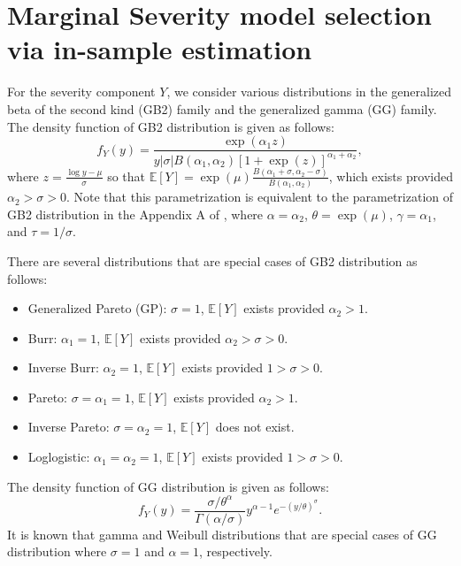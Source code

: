\documentclass[11pt]{article}
\begin{document}
{\pagebreak
\appendix

\section{Marginal Severity model selection via in-sample estimation}
\label{app:A}

For the severity component $Y$, we consider various distributions in the generalized beta of the second kind (GB2) family and the generalized gamma (GG) family. The density function of GB2 distribution is given as follows:
$$
f_{Y}(y)={\frac {\exp(\alpha_1 z)}{y |\sigma| B(\alpha_1,\alpha_2)[1+\exp(z)]^{\alpha_1+\alpha_2}}},
$$
where  $z=\frac{\log y - \mu}{\sigma}$ so that $\mathbb{E}[Y]=\exp(\mu) \frac{B(\alpha_1+\sigma, \alpha_2-\sigma)}{B(\alpha_1, \alpha_2)}$, which exists provided $\alpha_2>\sigma>0$. Note that this parametrization is equivalent to the parametrization of GB2 distribution in the Appendix A of \citet{Klugman2012}, where $\alpha=\alpha_2$, $\theta= \exp(\mu)$, $\gamma=\alpha_1$, and $\tau=1/\sigma$. 

There are several distributions that are special cases of GB2 distribution as follows:
\begin{itemize}
	\item Generalized Pareto (GP): $\sigma=1$, $\mathbb{E}[Y]$ exists provided $\alpha_2>1$.
	\item Burr: $\alpha_1=1$, $\mathbb{E}[Y]$ exists provided $\alpha_2>\sigma >0$.
	\item Inverse Burr: $\alpha_2=1$, $\mathbb{E}[Y]$ exists provided $1>\sigma >0$.
	\item Pareto: $\sigma=\alpha_1=1$, $\mathbb{E}[Y]$ exists provided $\alpha_2>1$.
	\item Inverse Pareto: $\sigma=\alpha_2=1$, $\mathbb{E}[Y]$ does not exist.
	\item Loglogistic: $\alpha_1=\alpha_2=1$, $\mathbb{E}[Y]$ exists provided $1>\sigma >0$.
\end{itemize}

The density function of GG distribution is given as follows:
$$
f_{Y}(y)={\frac  {\sigma/\theta^{\alpha}}{\Gamma (\alpha/\sigma)}}y^{{\alpha-1}}e^{{-(y/\theta)^{\sigma}}}.
$$
It is known that gamma and Weibull distributions that are special cases of GG distribution where $\sigma=1$ and $\alpha=1$, respectively.

}
\end{document}
